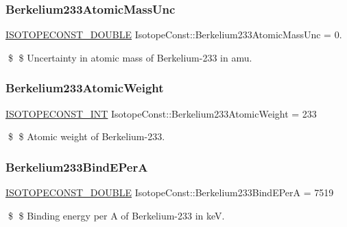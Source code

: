 \subsubsection{\texorpdfstring{Berkelium233\+Atomic\+Mass\+Unc}{Berkelium233AtomicMassUnc}}
{\footnotesize\ttfamily \mbox{\hyperlink{group___isotope_const-_macros_ga8f45a7272ce02c0b4c65c44636ed719a}{I\+S\+O\+T\+O\+P\+E\+C\+O\+N\+S\+T\+\_\+\+D\+O\+U\+B\+LE}} Isotope\+Const\+::\+Berkelium233\+Atomic\+Mass\+Unc = 0.}

\$ \$ Uncertainty in atomic mass of Berkelium-\/233 in amu. \mbox{\label{group___isotope_const-_berkelium-_bk233_ga02af08fc7d4f04ec2a0e58977628bffe}} 
\subsubsection{\texorpdfstring{Berkelium233\+Atomic\+Weight}{Berkelium233AtomicWeight}}
{\footnotesize\ttfamily \mbox{\hyperlink{group___isotope_const-_macros_ga5f18360b3e99483a35c32d789e62621c}{I\+S\+O\+T\+O\+P\+E\+C\+O\+N\+S\+T\+\_\+\+I\+NT}} Isotope\+Const\+::\+Berkelium233\+Atomic\+Weight = 233}

\$ \$ Atomic weight of Berkelium-\/233. \mbox{\label{group___isotope_const-_berkelium-_bk233_ga2a1a32752ba225ff221b020a86567caa}} 
\subsubsection{\texorpdfstring{Berkelium233\+Bind\+E\+PerA}{Berkelium233BindEPerA}}
{\footnotesize\ttfamily \mbox{\hyperlink{group___isotope_const-_macros_ga8f45a7272ce02c0b4c65c44636ed719a}{I\+S\+O\+T\+O\+P\+E\+C\+O\+N\+S\+T\+\_\+\+D\+O\+U\+B\+LE}} Isotope\+Const\+::\+Berkelium233\+Bind\+E\+PerA = 7519}

\$ \$ Binding energy per A of Berkelium-\/233 in keV. \mbox{\label{group___isotope_const-_berkelium-_bk233_ga250bb9742f826ad53c63f526e8bc8b50}} 
